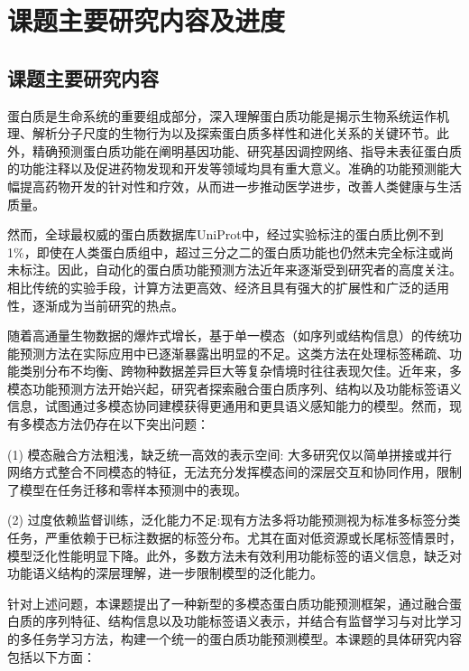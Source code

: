 
\chapter{课题主要研究内容及进度}


\section{课题主要研究内容}

蛋白质是生命系统的重要组成部分，深入理解蛋白质功能是揭示生物系统运作机理、解析分子尺度的生物行为以及探索蛋白质多样性和进化关系的关键环节\cite{eisenberg2000protein}。此外，精确预测蛋白质功能在阐明基因功能、研究基因调控网络、指导未表征蛋白质的功能注释以及促进药物发现和开发等领域均具有重大意义。准确的功能预测能大幅提高药物开发的针对性和疗效，从而进一步推动医学进步，改善人类健康与生活质量。

然而，全球最权威的蛋白质数据库UniProt\cite{uniprot2021uniprot}中，经过实验标注的蛋白质比例不到1\%，即使在人类蛋白质组中，超过三分之二的蛋白质功能也仍然未完全标注或尚未标注\cite{boutet2016uniprotkb}。因此，自动化的蛋白质功能预测方法近年来逐渐受到研究者的高度关注。相比传统的实验手段，计算方法更高效、经济且具有强大的扩展性和广泛的适用性，逐渐成为当前研究的热点。

随着高通量生物数据的爆炸式增长，基于单一模态（如序列或结构信息）的传统功能预测方法在实际应用中已逐渐暴露出明显的不足。这类方法在处理标签稀疏、功能类别分布不均衡、跨物种数据差异巨大等复杂情境时往往表现欠佳。近年来，多模态功能预测方法开始兴起，研究者探索融合蛋白质序列、结构以及功能标签语义信息，试图通过多模态协同建模获得更通用和更具语义感知能力的模型\cite{wang2023large}。然而，现有多模态方法仍存在以下突出问题：

(1) 模态融合方法粗浅，缺乏统一高效的表示空间: 大多研究仅以简单拼接或并行网络方式整合不同模态的特征，无法充分发挥模态间的深层交互和协同作用，限制了模型在任务迁移和零样本预测中的表现。

(2) 过度依赖监督训练，泛化能力不足:现有方法多将功能预测视为标准多标签分类任务，严重依赖于已标注数据的标签分布。尤其在面对低资源或长尾标签情景时，模型泛化性能明显下降。此外，多数方法未有效利用功能标签的语义信息，缺乏对功能语义结构的深层理解，进一步限制模型的泛化能力。

针对上述问题，本课题提出了一种新型的多模态蛋白质功能预测框架，通过融合蛋白质的序列特征、结构信息以及功能标签语义表示，并结合有监督学习与对比学习的多任务学习方法，构建一个统一的蛋白质功能预测模型。本课题的具体研究内容包括以下方面：

